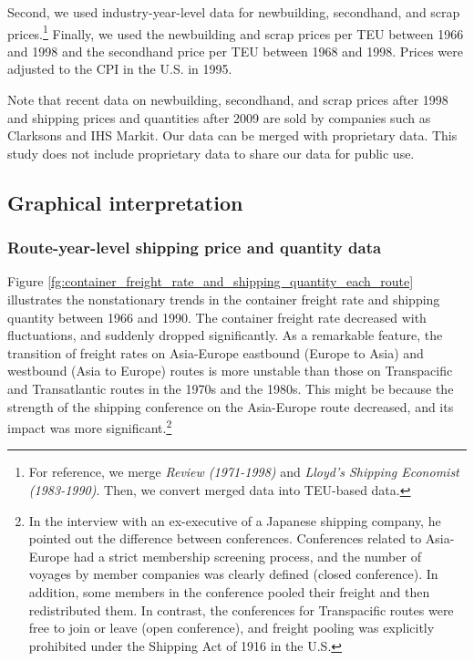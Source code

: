 \documentclass[11pt]{article}
\begin{document}
Second, we used industry-year-level data for newbuilding, secondhand, and scrap prices.\footnote{For reference, we merge \textit{Review (1971-1998)} and \textit{Lloyd's Shipping Economist (1983-1990)}. Then, we convert merged data into TEU-based data.} Finally, we used the newbuilding and scrap prices per TEU between 1966 and 1998 and the secondhand price per TEU between 1968 and 1998. Prices were adjusted to the CPI in the U.S. in 1995. 

Note that recent data on newbuilding, secondhand, and scrap prices after 1998 and shipping prices and quantities after 2009 are sold by companies such as Clarksons and IHS Markit. Our data can be merged with proprietary data. This study does not include proprietary data to share our data for public use.

\subsection{Graphical interpretation}\label{subsec:graphical_interpretation}
\subsubsection{Route-year-level shipping price and quantity data}



Figure \ref{fg:container_freight_rate_and_shipping_quantity_each_route} illustrates the nonstationary trends in the container freight rate and shipping quantity between 1966 and 1990. The container freight rate decreased with fluctuations, and suddenly dropped significantly. As a remarkable feature, the transition of freight rates on Asia-Europe eastbound (Europe to Asia) and westbound (Asia to Europe) routes is more unstable than those on Transpacific and Transatlantic routes in the 1970s and the 1980s. This might be because the strength of the shipping conference on the Asia-Europe route decreased, and its impact was more significant.\footnote{In the interview with an ex-executive of a Japanese shipping company, he pointed out the difference between conferences. Conferences related to Asia-Europe had a strict membership screening process, and the number of voyages by member companies was clearly defined (closed conference). In addition, some members in the conference pooled their freight and then redistributed them. In contrast, the conferences for Transpacific routes were free to join or leave (open conference), and freight pooling was explicitly prohibited under the Shipping Act of 1916 in the U.S.} 
\end{document}
